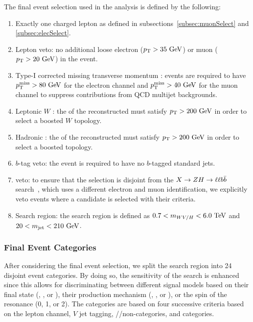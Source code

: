 The final event selection used in the analysis is defined by the following:
\begin{enumerate}
  \item Exactly one charged lepton as defined in subsections~\ref{subsec:muonSelect} and \ref{subsec:elecSelect}.
  \item Lepton veto: no additional loose electron ($\pt>35\unit{GeV}$) or muon ($\pt>20\unit{GeV}$) in the event.
  \item Type-I corrected missing transverse momentum \ptmissTI: events are required to have $\ptmiss>80\unit{GeV}$ for the electron channel and $\ptmiss>40\unit{GeV}$ for the muon channel to suppress contributions from QCD multijet backgrounds.
  \item Leptonic $W$ \pt: the \pt of the reconstructed \Wlep must satisfy $\pt>200\unit{GeV}$ in order to select a boosted $W$ topology.
  \item Hadronic \VorH \pt: the \pt of the reconstructed \Vhad must satisfy $\pt>200\unit{GeV}$ in order to select a boosted \VorH topology.
  \item $b$-tag veto: the event is required to have no $b$-tagged standard jets.
  \item \ZH veto: to ensure that the selection is disjoint from the $X\to\ZH\to\ell\ell\bbbar$ search~\cite{CMS-PAS-B2G-19-006}, which uses a different electron and muon identification, we explicitly veto events where a \ZH candidate is selected with their criteria.
  \item Search region: the search region is defined as $0.7<\MVV<6.0\unit{TeV}$ and $20<\MJ<210\unit{GeV}$.
\end{enumerate}

\subsubsection{Final Event Categories}
\label{subsec:eventCat}

After considering the final event selection, we split the search region into 24 disjoint event categories.
By doing so, the sensitivity of the search is enhanced since this allows for discriminating between different signal models based on their final state (\WW, \WZ, or \WH), their production mechanism (\ggF, \DY, or \VBF), or the spin of the resonance (0, 1, or 2).
The categories are based on four successive criteria based on the lepton channel, $V$ jet tagging, \VBF/\bbbar/non-\bbbar categories, and \Dy categories.

